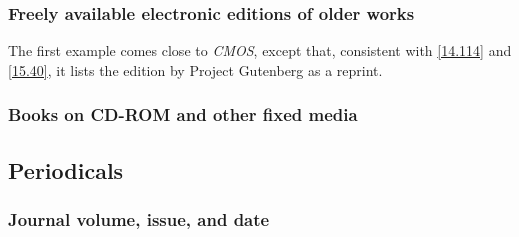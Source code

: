 \documentclass[11pt,letterpaper,oneside]{article}
\begin{document}
\begin{citebib}
\item \cite[chap. 3, \url{https://doi.org/10.1093/acprof:oso/9780199343638.003.0004}]{bonds2014}
\item \cite[59]{lystra2004}
\item \cite[chap. 11, \url{https://doi.org/10.1093/acprof:oso/9780199343638.003.0012}]{bonds2014}
\item \cite[60--61]{lystra2004}
\end{citebib}

\subsubsection{Freely available electronic editions of older works}

The first example comes close to \textit{CMOS}, except that,
consistent with \ref{14.114} and \ref{15.40}, it lists the edition by
Project Gutenberg as a reprint.

\begin{citebib}
\item \cite[bk. 6, chap. 1]{james2008}
\item \cite[1:243]{james1909}
\end{citebib}

\subsubsection{Books on CD-ROM and other fixed media}
\label{14.163}

\begin{citebib}
\item \cite*[1.4]{chicago2003}
\end{citebib}

\setcounter{subsection}{5}
\subsection{Periodicals}
\setcounter{subsection}{14}

\setcounter{subsubsection}{170}
\subsubsection{Journal volume, issue, and date}
\label{14.171}
\end{document}
